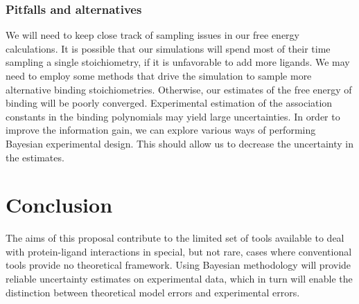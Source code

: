 \documentclass[10pt,final]{article}
\begin{document}
\subsubsection*{Pitfalls and alternatives}
We will need to keep close track of sampling issues in our free energy calculations.
%
It is possible that our simulations will spend most of their time sampling a single stoichiometry, if it is unfavorable to add more ligands.
%
We may need to employ some methods that drive the simulation to sample more alternative binding stoichiometries.
%
Otherwise, our estimates of the free energy of binding will be poorly converged.
%
Experimental estimation of the association constants in the binding polynomials may yield large uncertainties.
%
In order to improve the information gain, we can explore various ways of performing Bayesian experimental design.
%
This should allow us to decrease the uncertainty in the estimates.

\section*{Conclusion}
The aims of this proposal contribute to the limited set of tools available to deal with protein-ligand interactions in special, but not rare, cases where conventional tools provide no theoretical framework. Using Bayesian methodology will provide reliable uncertainty estimates on experimental data, which in turn will enable the distinction between theoretical model errors and experimental errors.

\setlength{\emergencystretch}{1em}
\printbibliography
\end{document}
